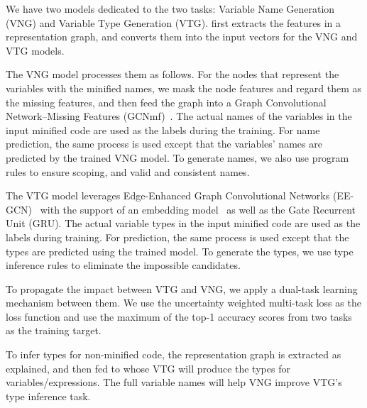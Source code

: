We have two models dedicated to the two tasks: Variable Name
Generation (VNG) and Variable Type Generation (VTG). {\tool}
first extracts the features in a representation graph,
and converts them into the input vectors for the VNG and VTG models.

The VNG model processes them as follows.
For the nodes that represent the variables with the minified names, we
mask the node features and regard them as the missing features, and
then feed the graph into a Graph Convolutional
Network--Missing Features (GCNmf)~\cite{GCNmf}. The actual names of
the variables in the input minified code are used as the labels during
the training. For name prediction, the same
process is used except that the variables' names are predicted
by the trained VNG model. To generate names, we also use program
 rules to ensure scoping, and valid and consistent names.

The VTG model leverages Edge-Enhanced Graph Convolutional Networks
(EE-GCN)~\cite{ee-gcn} with the support of an embedding
model~\cite{pennington2014glove} as well as the Gate Recurrent Unit
(GRU). The actual variable types in the input minified code
are used as the labels during training. For prediction, the same
process is used except that the types are predicted
using the trained model. To generate the types, we use type
inference rules to eliminate the impossible candidates.


To propagate the impact between VTG and VNG, we apply a dual-task
learning mechanism between them. We use the uncertainty weighted
multi-task loss as the loss function and use the
maximum of the top-1 accuracy scores from two tasks as the training
target.

To infer types for non-minified code, the representation graph is
extracted as explained, and then fed to {\tool} whose VTG will produce
the types for variables/expressions. The full variable names will help
VNG improve VTG's type inference task.




